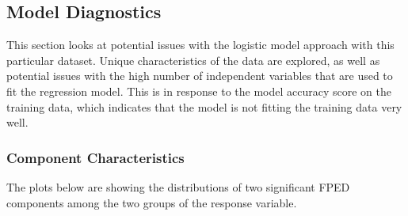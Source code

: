\documentclass{article}
\begin{document}
\subsection{Model Diagnostics}
\label{ssec:subhead}

This section looks at potential issues with the logistic model approach with this particular dataset. Unique characteristics of the data are explored, as well as potential issues with the high number of independent variables that are used to fit the regression model. This is in response to the model accuracy score on the training data, which indicates that the model is not fitting the training data very well.

\subsubsection{Component Characteristics}
\label{sssec:subsubhead}

The plots below are showing the distributions of two significant FPED components among the two groups of the response variable. 
\end{document}

